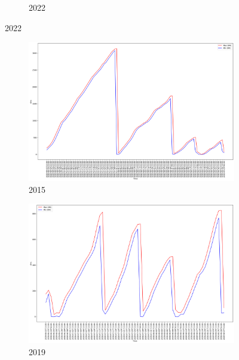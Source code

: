 \begin{figure}[h]
\begin{subfigure}{0.45\textwidth}
		\caption{2022}
	\end{subfigure}
	
	\label{fig:daily_ffmc_maxmin}
\end{figure}


\begin{figure}[h]
	\centering
	\caption{Daily max and min DMC values}
	\begin{subfigure}{0.45\textwidth}
		\centering
		\includegraphics[width=\textwidth]{graphs/2015/byHour/DMC_maxMin.png}
		\caption{2015}
	\end{subfigure}
	\hfill
	\begin{subfigure}{0.45\textwidth}
		\centering
		\includegraphics[width=\textwidth]{graphs/2019/byHour/DMC_maxMin.png}
		\caption{2019}
	\end{subfigure}
	\hfill
	\begin{subfigure}{0.45\textwidth}

\end{subfigure}
\end{figure}
